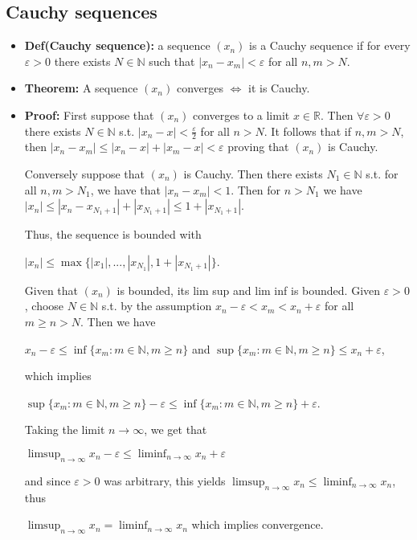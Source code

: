 \documentclass{article}
\begin{document}
\subsection{Cauchy sequences}
\begin{itemize}
    \item \textbf{Def(Cauchy sequence):} a sequence $(x_n)$ is a Cauchy sequence if for every $\varepsilon > 0$ there exists $N \in \mathbb{N}$ such that $|x_n - x_m| < \varepsilon$ for all $n, m > N$. 
    \item \textbf{Theorem:} A sequence $(x_n)$ converges $\iff$ it is Cauchy.
    \item \textbf{Proof:} First suppose that $(x_n)$ converges to a limit $x \in \mathbb{R}$. Then $\forall \varepsilon > 0$ there exists $N \in \mathbb{N}$ s.t. $|x_n - x| < \frac{\varepsilon}{2}$ for all $n > N$. It follows that if $n, m > N$, then $|x_n - x_m| \leq |x_n - x| + |x_m - x| < \varepsilon$ proving that $(x_n)$ is Cauchy.

    Conversely suppose that $(x_n)$ is Cauchy. Then there exists $N_1 \in \mathbb{N}$ s.t. for all $n, m > N_1$, we have that $|x_n - x_m| < 1$. Then for $n > N_1$ we have $|x_n| \leq |x_n - x_{N_1 + 1}| + |x_{N_1 + 1}| \leq 1 + |x_{N_1 + 1}|$. 
    
    Thus, the sequence is bounded with 
    
    $|x_n| \leq \max\{|x_1|, ... , |x_{N_1}|, 1+|x_{N_1 + 1}|\}$.
    
    Given that $(x_n)$ is bounded, its lim sup and lim inf is bounded. Given $\varepsilon > 0$, choose $N \in \mathbb{N}$ s.t. by the assumption $x_n - \varepsilon < x_m < x_n + \varepsilon$ for all $m \geq n > N$. Then we have 
    
    $x_n - \varepsilon \leq \inf\{x_m: m \in \mathbb{N}, m \geq n\}$ and $\sup\{x_m: m \in \mathbb{N}, m \geq n\} \leq x_n + \varepsilon$,
    
    which implies 
    
    $\sup\{x_m: m \in \mathbb{N}, m \geq n\} - \varepsilon \leq \inf\{x_m: m \in \mathbb{N}, m \geq n\} + \varepsilon$. 
    
    Taking the limit $n \to \infty$, we get that 
    
    $\displaystyle \limsup_{n \to \infty} x_n - \varepsilon \leq \liminf_{n \to \infty} x_n + \varepsilon$ 
    
    and since $\varepsilon > 0$ was arbitrary, this yields $\displaystyle \limsup_{n \to \infty} x_n \leq \liminf_{n \to \infty} x_n$, thus 
    
    $\displaystyle \limsup_{n \to \infty} x_n = \liminf_{n \to \infty} x_n$ which implies convergence.
\end{itemize}
\end{document}
